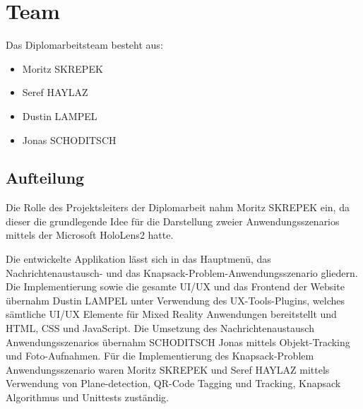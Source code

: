 \section{Team}
Das Diplomarbeitsteam besteht aus:
\begin{itemize}
    \item Moritz SKREPEK
    \item Seref HAYLAZ
    \item Dustin LAMPEL
    \item Jonas SCHODITSCH
\end{itemize}

\subsection{Aufteilung}
Die Rolle des Projektsleiters der Diplomarbeit nahm Moritz SKREPEK ein, da dieser die grundlegende Idee für die Darstellung
zweier Anwendungsszenarios mittels der Microsoft HoloLens2 hatte.

Die entwickelte Applikation lässt sich in das Hauptmenü, das Nachrichtenaustausch- und das Knapsack-Problem-Anwendungsszenario
gliedern. Die Implementierung sowie die gesamte UI/UX und das Frontend der Website übernahm Dustin LAMPEL unter Verwendung
des UX-Tools-Plugins, welches sämtliche UI/UX Elemente für Mixed Reality Anwendungen bereitstellt und HTML, CSS und JavaScript.
Die Umsetzung des Nachrichtenaustausch Anwendungsszenarios übernahm SCHODITSCH Jonas mittels Objekt-Tracking und Foto-Aufnahmen. Für
die Implementierung des Knapsack-Problem Anwendungsszenario waren Moritz SKREPEK und Seref HAYLAZ mittels Verwendung von Plane-detection,
QR-Code Tagging und Tracking, Knapsack Algorithmus und Unittests zuständig.



